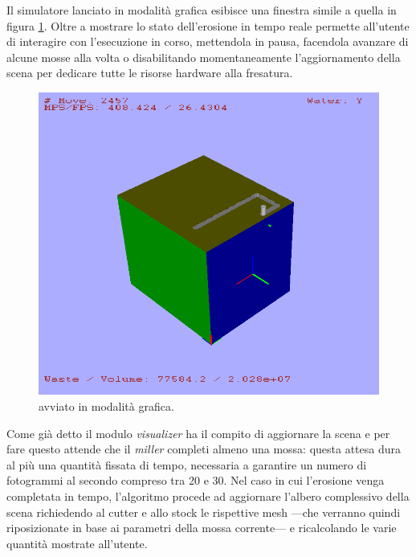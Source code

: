 Il simulatore lanciato in modalità grafica esibisce una finestra simile a quella in figura \ref{fig:visualizer_graphicmode}. Oltre a mostrare lo stato dell'erosione in tempo reale permette all'utente di interagire con l'esecuzione in corso, mettendola in pausa, facendola avanzare di alcune mosse alla volta o disabilitando momentaneamente l'aggiornamento della scena per dedicare tutte le risorse hardware alla fresatura.
\begin{figure}[htp]
	\centering
	\includegraphics[width=.85\textwidth]{img/visualizer_graphicmode}
	\caption{ avviato in modalità grafica.}
	\label{fig:visualizer_graphicmode}
\end{figure}

Come già detto il modulo \emph{visualizer} ha il compito di aggiornare la scena e per fare questo attende che il \emph{miller} completi almeno una mossa: questa attesa dura al più una quantità fissata di tempo, necessaria a garantire un numero di fotogrammi al secondo compreso tra 20 e 30. Nel caso in cui l'erosione venga completata in tempo, l'algoritmo procede ad aggiornare l'albero complessivo della scena richiedendo al cutter e allo stock le rispettive mesh ---che verranno quindi riposizionate in base ai parametri della mossa corrente--- e ricalcolando le varie quantità mostrate all'utente.
